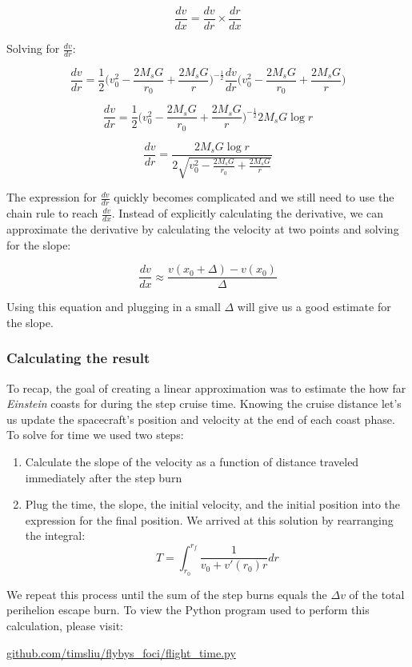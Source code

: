 \documentclass[12pt]{article} %
\begin{document}
$$\frac{dv}{dx} = \frac{dv}{dr}\times\frac{dr}{dx}$$

Solving for $\frac{dv}{dr}$:

$$\frac{dv}{dr} = \frac{1}{2} \bigg(v_0^2-\frac{2M_sG}{r_0} + \frac{2M_sG}{r}\bigg)^{-\frac{1}{2}}\frac{dv}{dr}\bigg(v_0^2-\frac{2M_sG}{r_0} + \frac{2M_sG}{r}\bigg)$$

$$\frac{dv}{dr} = \frac{1}{2} \bigg(v_0^2-\frac{2M_sG}{r_0} + \frac{2M_sG}{r}\bigg)^{-\frac{1}{2}}2M_sG\log{r}$$

$$\frac{dv}{dr} = \frac{2M_sG \log{r}}{2 \sqrt{v_0^2-\frac{2M_sG}{r_0} + \frac{2M_sG}{r}}}$$

The expression for $\frac{dv}{dr}$ quickly becomes complicated and we still need to use the chain rule to reach $\frac{dv}{dx}$. Instead of explicitly calculating the derivative, we can approximate the derivative by calculating the velocity at two points and solving for the slope:

$$\frac{dv}{dx} \approx \frac{v(x_0 +\Delta) - v(x_0)}{\Delta}$$

Using this equation and plugging in a small $\Delta$ will give us a good estimate for the slope.


\subsubsection{Calculating the result}
To recap, the goal of creating a linear approximation was to estimate the how far \textit{Einstein} coasts for during the step cruise time. Knowing the cruise distance let's us update the spacecraft's position and velocity at the end of each coast phase. To solve for time we used two steps:
\begin{enumerate}
\item Calculate the slope of the velocity as a function of distance traveled immediately after the step burn
\item Plug the time, the slope, the initial velocity, and the initial position into the expression for the final position. We arrived at this solution by rearranging the integral:
$$\boxed{T = \int_{r_0}^{r_f} \frac{1}{v_0+v'(r_0)r} dr}$$
\end{enumerate}

We repeat this process until the sum of the step burns equals the $\Delta v$ of the total perihelion escape burn. To view the Python program used to perform this calculation, please visit:

\url{github.com/timsliu/flybys_foci/flight_time.py}
\end{document}

